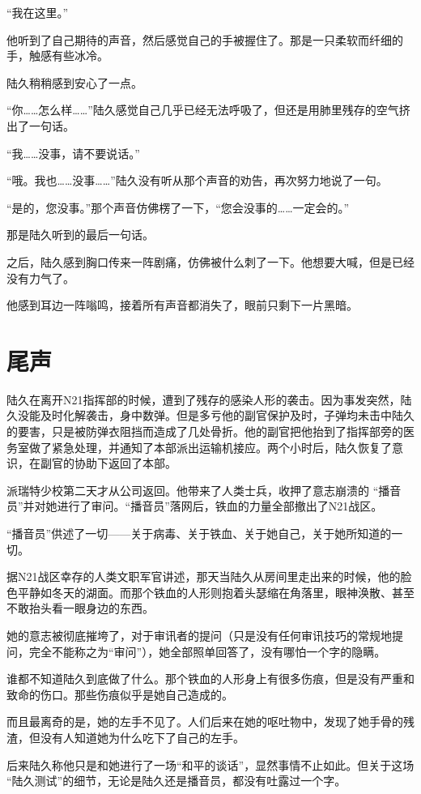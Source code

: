 “我在这里。”

他听到了自己期待的声音，然后感觉自己的手被握住了。那是一只柔软而纤细的手，触感有些冰冷。

陆久稍稍感到安心了一点。

“你……怎么样……”陆久感觉自己几乎已经无法呼吸了，但还是用肺里残存的空气挤出了一句话。

“我……没事，请不要说话。”

“哦。我也……没事……”陆久没有听从那个声音的劝告，再次努力地说了一句。

“是的，您没事。”那个声音仿佛楞了一下，“您会没事的……一定会的。”

那是陆久听到的最后一句话。

之后，陆久感到胸口传来一阵剧痛，仿佛被什么刺了一下。他想要大喊，但是已经没有力气了。

他感到耳边一阵嗡鸣，接着所有声音都消失了，眼前只剩下一片黑暗。



\section{尾声}

陆久在离开N21指挥部的时候，遭到了残存的感染人形的袭击。因为事发突然，陆久没能及时化解袭击，身中数弹。但是多亏他的副官保护及时，子弹均未击中陆久的要害，只是被防弹衣阻挡而造成了几处骨折。他的副官把他抬到了指挥部旁的医务室做了紧急处理，并通知了本部派出运输机接应。两个小时后，陆久恢复了意识，在副官的协助下返回了本部。

派瑞特少校第二天才从公司返回。他带来了人类士兵，收押了意志崩溃的 “播音员”并对她进行了审问。“播音员”落网后，铁血的力量全部撤出了N21战区。

“播音员”供述了一切——关于病毒、关于铁血、关于她自己，关于她所知道的一切。

据N21战区幸存的人类文职军官讲述，那天当陆久从房间里走出来的时候，他的脸色平静如冬天的湖面。而那个铁血的人形则抱着头瑟缩在角落里，眼神涣散、甚至不敢抬头看一眼身边的东西。

她的意志被彻底摧垮了，对于审讯者的提问（只是没有任何审讯技巧的常规地提问，完全不能称之为“审问”），她全部照单回答了，没有哪怕一个字的隐瞒。

谁都不知道陆久到底做了什么。那个铁血的人形身上有很多伤痕，但是没有严重和致命的伤口。那些伤痕似乎是她自己造成的。

而且最离奇的是，她的左手不见了。人们后来在她的呕吐物中，发现了她手骨的残渣，但没有人知道她为什么吃下了自己的左手。

后来陆久称他只是和她进行了一场“和平的谈话”，显然事情不止如此。但关于这场 “陆久测试”的细节，无论是陆久还是播音员，都没有吐露过一个字。

